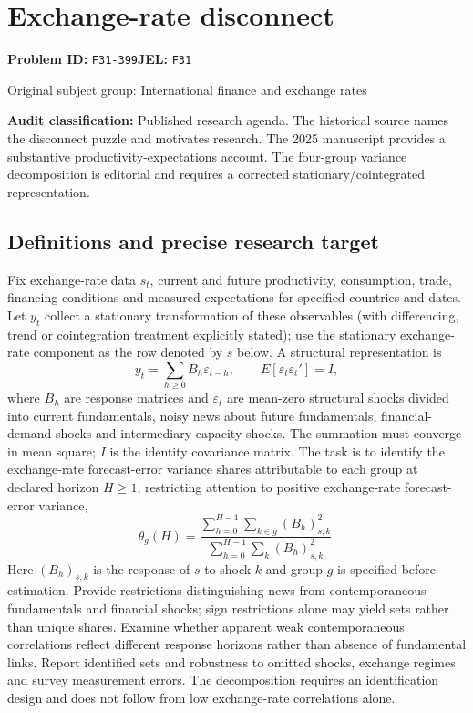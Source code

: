 \documentclass[11pt,a4paper]{article}
\begin{document}
\section*{Exchange-rate disconnect}
\textbf{Problem ID:} \texttt{F31-399}\quad \textbf{JEL:} \texttt{F31}\par
\label{problem:OP-0331}
{\sffamily\small\color{muted}Original subject group: International finance and exchange rates\par}
\label{definitions:problem:30007613}
\textbf{Audit classification:} Published research agenda. The historical source names the disconnect puzzle and motivates research. The 2025 manuscript provides a substantive productivity-expectations account. The four-group variance decomposition is editorial and requires a corrected stationary/cointegrated representation.
\subsection*{Definitions and precise research target}
Fix exchange-rate data \(s_t\), current and future productivity, consumption, trade, financing conditions and measured expectations for specified countries and dates. Let \(y_t\) collect a stationary transformation of these observables (with differencing, trend or cointegration treatment explicitly stated); use the stationary exchange-rate component as the row denoted by \(s\) below. A structural representation is
\[y_t=\sum_{h\geq0}B_h\varepsilon_{t-h},\qquad E[\varepsilon_t\varepsilon_t']=I,\]
where \(B_h\) are response matrices and \(\varepsilon_t\) are mean-zero structural shocks divided into current fundamentals, noisy news about future fundamentals, financial-demand shocks and intermediary-capacity shocks. The summation must converge in mean square; \(I\) is the identity covariance matrix. The task is to identify the exchange-rate forecast-error variance shares attributable to each group at declared horizon \(H\geq1\), restricting attention to positive exchange-rate forecast-error variance,
\[\theta_g(H)=\frac{\sum_{h=0}^{H-1}\sum_{k\in g}(B_h)_{s,k}^2}{\sum_{h=0}^{H-1}\sum_k(B_h)_{s,k}^2}.\]
Here \((B_h)_{s,k}\) is the response of \(s\) to shock \(k\) and group \(g\) is specified before estimation. Provide restrictions distinguishing news from contemporaneous fundamentals and financial shocks; sign restrictions alone may yield sets rather than unique shares. Examine whether apparent weak contemporaneous correlations reflect different response horizons rather than absence of fundamental links. Report identified sets and robustness to omitted shocks, exchange regimes and survey measurement errors. The decomposition requires an identification design and does not follow from low exchange-rate correlations alone.
\end{document}

